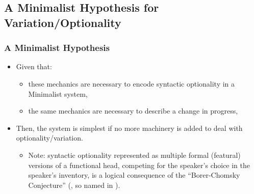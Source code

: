 \documentclass[hyperref={pdfpagelabels=false}]{beamer}
\begin{document}
\subsection{A Minimalist Hypothesis for Variation/Optionality}
\begin{frame}
\frametitle{A Minimalist Hypothesis}
\begin{itemize}
	\item[ ] Given that: 
		\begin{itemize} 
		\item these mechanics are necessary to encode syntactic optionality in a Minimalist system,
		\item the same mechanics are necessary to describe a change in progress,
		\end{itemize}
	\item[ ] Then, the system is simplest if no more machinery is added to deal with optionality/variation.
		\begin{itemize} \item Note: syntactic optionality represented as multiple formal (featural) versions of a functional head, competing for the speaker's choice in the speaker's inventory, is a logical consequence of the ``Borer-Chomsky Conjecture'' (\citealt{borer1984}, so named in \citealt{baker2008}).
		\end{itemize}

\end{itemize}

\end{frame}
\end{document}
